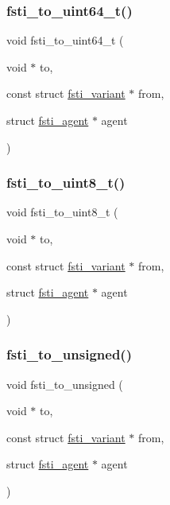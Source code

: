 \subsubsection{\texorpdfstring{fsti\+\_\+to\+\_\+uint64\+\_\+t()}{fsti\_to\_uint64\_t()}}
{\footnotesize\ttfamily void fsti\+\_\+to\+\_\+uint64\+\_\+t (\begin{DoxyParamCaption}\item[{void $\ast$}]{to,  }\item[{const struct \mbox{\hyperlink{structfsti__variant}{fsti\+\_\+variant}} $\ast$}]{from,  }\item[{struct \mbox{\hyperlink{structfsti__agent}{fsti\+\_\+agent}} $\ast$}]{agent }\end{DoxyParamCaption})}

\mbox{\label{fsti-events_8h_ae35be4fced1f9a93476a536b20332478}} 
\subsubsection{\texorpdfstring{fsti\+\_\+to\+\_\+uint8\+\_\+t()}{fsti\_to\_uint8\_t()}}
{\footnotesize\ttfamily void fsti\+\_\+to\+\_\+uint8\+\_\+t (\begin{DoxyParamCaption}\item[{void $\ast$}]{to,  }\item[{const struct \mbox{\hyperlink{structfsti__variant}{fsti\+\_\+variant}} $\ast$}]{from,  }\item[{struct \mbox{\hyperlink{structfsti__agent}{fsti\+\_\+agent}} $\ast$}]{agent }\end{DoxyParamCaption})}

\mbox{\label{fsti-events_8h_a0dea3a294caae9f80119ec53f4116f0f}} 
\subsubsection{\texorpdfstring{fsti\+\_\+to\+\_\+unsigned()}{fsti\_to\_unsigned()}}
{\footnotesize\ttfamily void fsti\+\_\+to\+\_\+unsigned (\begin{DoxyParamCaption}\item[{void $\ast$}]{to,  }\item[{const struct \mbox{\hyperlink{structfsti__variant}{fsti\+\_\+variant}} $\ast$}]{from,  }\item[{struct \mbox{\hyperlink{structfsti__agent}{fsti\+\_\+agent}} $\ast$}]{agent }\end{DoxyParamCaption})}



